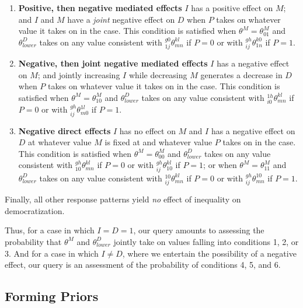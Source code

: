 \documentclass[12pt,]{book}
\begin{document}
\begin{enumerate}
\def\labelenumi{\arabic{enumi}.}
\setcounter{enumi}{3}
\item
  \textbf{Positive, then negative mediated effects} \(I\) has a positive effect on \(M\); and \(I\) and \(M\) have a \emph{joint} negative effect on \(D\) when \(P\) takes on whatever value it takes on in the case. This condition is satisfied when \(\theta^M=\theta^M_{01}\) and \(\theta^D_{lower}\) takes on any value consistent with \(_{1j}^{g0}\theta_{mn}^{kl}\) if \(P=0\) or with \(_{ij}^{gh}\theta_{1n}^{k0}\) if \(P=1\).
\item
  \textbf{Negative, then joint negative mediated effects} \(I\) has a negative effect on \(M\); and jointly increasing \(I\) while decreasing \(M\) generates a decrease in \(D\) when \(P\) takes on whatever value it takes on in the case. This condition is satisfied when \(\theta^M=\theta^M_{10}\) and \(\theta^D_{lower}\) takes on any value consistent with \(_{i0}^{1h}\theta_{mn}^{kl}\) if \(P=0\) or with \(_{ij}^{gh}\theta_{m0}^{1l}\) if \(P=1\).
\item
  \textbf{Negative direct effects} \(I\) has no effect on \(M\) and \(I\) has a negative effect on \(D\) at whatever value \(M\) is fixed at and whatever value \(P\) takes on in the case. This condition is satisfied when \(\theta^M=\theta^M_{00}\) and \(\theta^D_{lower}\) takes on any value consistent with \(_{10}^{gh}\theta_{mn}^{kl}\) if \(P=0\) or with \(_{ij}^{gh}\theta_{10}^{kl}\) if \(P=1\); or when \(\theta^M=\theta^M_{11}\) and \(\theta^D_{lower}\) takes on any value consistent with \(_{ij}^{10}\theta_{mn}^{kl}\) if \(P=0\) or with \(_{ij}^{gh}\theta_{mn}^{10}\) if \(P=1\).
\end{enumerate}

Finally, all other response patterns yield \emph{no} effect of inequality on democratization.

Thus, for a case in which \(I=D=1\), our query amounts to assessing the probability that \(\theta^M\) and \(\theta^D_{lower}\) jointly take on values falling into conditions 1, 2, or 3. And for a case in which \(I \neq D\), where we entertain the possibility of a negative effect, our query is an assessment of the probability of conditions 4, 5, and 6.

\hypertarget{forming-priors}{%
\subsection{Forming Priors}\label{forming-priors}}
\end{document}
